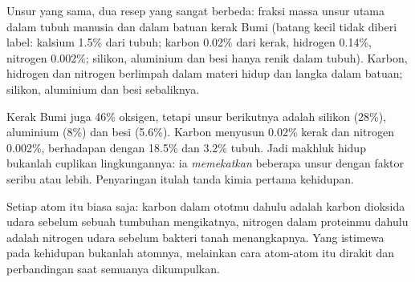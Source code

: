 \begin{omfigure}

{\small Unsur yang sama, dua resep yang sangat berbeda: fraksi massa
unsur utama dalam tubuh manusia dan dalam batuan kerak Bumi (batang
kecil tidak diberi label: kalsium 1.5\% dari tubuh; karbon 0.02\% dari
kerak, hidrogen 0.14\%, nitrogen 0.002\%; silikon, aluminium dan besi
hanya renik dalam tubuh). Karbon, hidrogen dan nitrogen berlimpah dalam
materi hidup dan langka dalam batuan; silikon, aluminium dan besi
sebaliknya.}
\end{omfigure}

\begin{example}\label{ex:g10:chemistry-of-life:crust}
Kerak Bumi juga 46\% oksigen, tetapi unsur berikutnya adalah silikon
(28\%), aluminium (8\%) dan besi (5.6\%). Karbon menyusun 0.02\% kerak
dan nitrogen 0.002\%, berhadapan dengan 18.5\% dan 3.2\% tubuh. Jadi
makhluk hidup bukanlah cuplikan lingkungannya: ia
\emph{memekatkan} beberapa unsur dengan faktor seribu atau lebih.
Penyaringan itulah tanda kimia pertama kehidupan.
\end{example}

\begin{remark}\label{rem:g10:chemistry-of-life:origin}
Setiap atom itu biasa saja: karbon dalam ototmu dahulu adalah karbon
dioksida udara sebelum sebuah tumbuhan mengikatnya, nitrogen dalam
proteinmu dahulu adalah nitrogen udara sebelum bakteri tanah
menangkapnya. Yang istimewa pada kehidupan bukanlah atomnya, melainkan
cara atom-atom itu dirakit dan perbandingan saat semuanya dikumpulkan.
\end{remark}

